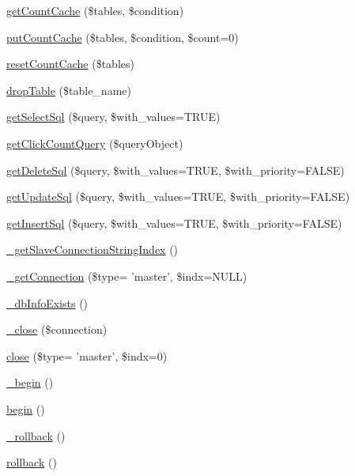 \begin{DoxyCompactItemize}
\item 
\hyperlink{classDB_af638cf3ae9ad406810b2f8c2d322225c}{get\+Count\+Cache} (\$tables, \$condition)
\item 
\hyperlink{classDB_a90771d4eaa0ff60a1ddbeb338f2ab801}{put\+Count\+Cache} (\$tables, \$condition, \$count=0)
\item 
\hyperlink{classDB_a8167fd227a1955f8300c0d0e70dd9d9e}{reset\+Count\+Cache} (\$tables)
\item 
\hyperlink{classDB_a63a3a5bdc8e30e1cee37cefddd5ce8de}{drop\+Table} (\$table\+\_\+name)
\item 
\hyperlink{classDB_a5324aefa22399846c6a7fb8afeb6e55d}{get\+Select\+Sql} (\$query, \$with\+\_\+values=T\+R\+U\+E)
\item 
\hyperlink{classDB_a75a6b61801ef6ed2bbf092f1333a8ccd}{get\+Click\+Count\+Query} (\$query\+Object)
\item 
\hyperlink{classDB_aeb58bf0e323895cdc7eda34f09254ed6}{get\+Delete\+Sql} (\$query, \$with\+\_\+values=T\+R\+U\+E, \$with\+\_\+priority=F\+A\+L\+S\+E)
\item 
\hyperlink{classDB_ac467d003673def17f4d397e3f25bcf84}{get\+Update\+Sql} (\$query, \$with\+\_\+values=T\+R\+U\+E, \$with\+\_\+priority=F\+A\+L\+S\+E)
\item 
\hyperlink{classDB_a2664c0b5ba2bc70d02504ebf343e913e}{get\+Insert\+Sql} (\$query, \$with\+\_\+values=T\+R\+U\+E, \$with\+\_\+priority=F\+A\+L\+S\+E)
\item 
\hyperlink{classDB_a8dc4e826557c3de0d49adf7e6112bfea}{\+\_\+get\+Slave\+Connection\+String\+Index} ()
\item 
\hyperlink{classDB_a52b496d073cecfd2ca6e14897b559819}{\+\_\+get\+Connection} (\$type= 'master', \$indx=N\+U\+L\+L)
\item 
\hyperlink{classDB_a3bbfb0e7579e8d6fc27a20c1219bb693}{\+\_\+db\+Info\+Exists} ()
\item 
\hyperlink{classDB_a8c161612a558f47fb008dec4b46ee05c}{\+\_\+close} (\$connection)
\item 
\hyperlink{classDB_a99ab404981e46ae5b48e11ce46290500}{close} (\$type= 'master', \$indx=0)
\item 
\hyperlink{classDB_ab081086c9f44c12dce30d78e00141986}{\+\_\+begin} ()
\item 
\hyperlink{classDB_a41aea6b3a6787467fcfd16d28a302c54}{begin} ()
\item 
\hyperlink{classDB_ac537ae2001731b709a4b60992b04275b}{\+\_\+rollback} ()
\item 
\hyperlink{classDB_a1fb6903379bc241fd318b980b9e30882}{rollback} ()

\end{DoxyCompactItemize}
